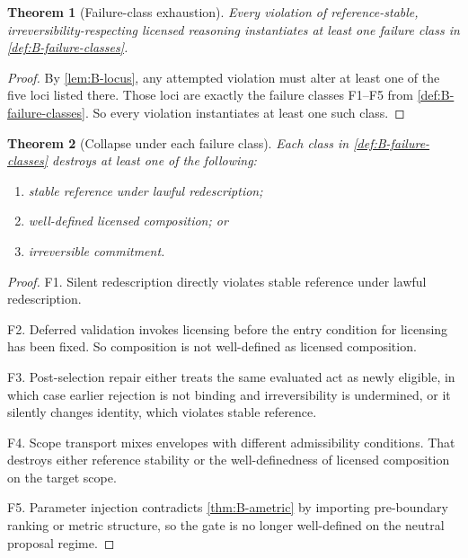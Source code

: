 \documentclass[11pt]{article}
\theoremstyle{plain}
\newtheorem{theorem}{Theorem}[section]
\theoremstyle{definition}
\begin{document}
\begin{theorem}[Failure-class exhaustion]
\label{thm:B-failure-exhaustion}
Every violation of reference-stable, irreversibility-respecting licensed reasoning instantiates at least one failure class in \cref{def:B-failure-classes}.
\end{theorem}

\begin{proof}
By \cref{lem:B-locus}, any attempted violation must alter at least one of the five loci listed there. Those loci are exactly the failure classes F1--F5 from \cref{def:B-failure-classes}. So every violation instantiates at least one such class.
\end{proof}

\begin{theorem}[Collapse under each failure class]
\label{thm:B-failure-collapse}
Each class in \cref{def:B-failure-classes} destroys at least one of the following:
\begin{enumerate}[label=(\alph*), leftmargin=2.5em]
    \item stable reference under lawful redescription;
    \item well-defined licensed composition; or
    \item irreversible commitment.
\end{enumerate}
\end{theorem}

\begin{proof}
F1. Silent redescription directly violates stable reference under lawful redescription.

F2. Deferred validation invokes licensing before the entry condition for licensing has been fixed. So composition is not well-defined as licensed composition.

F3. Post-selection repair either treats the same evaluated act as newly eligible, in which case earlier rejection is not binding and irreversibility is undermined, or it silently changes identity, which violates stable reference.

F4. Scope transport mixes envelopes with different admissibility conditions. That destroys either reference stability or the well-definedness of licensed composition on the target scope.

F5. Parameter injection contradicts \cref{thm:B-ametric} by importing pre-boundary ranking or metric structure, so the gate is no longer well-defined on the neutral proposal regime.
\end{proof}
\end{document}
